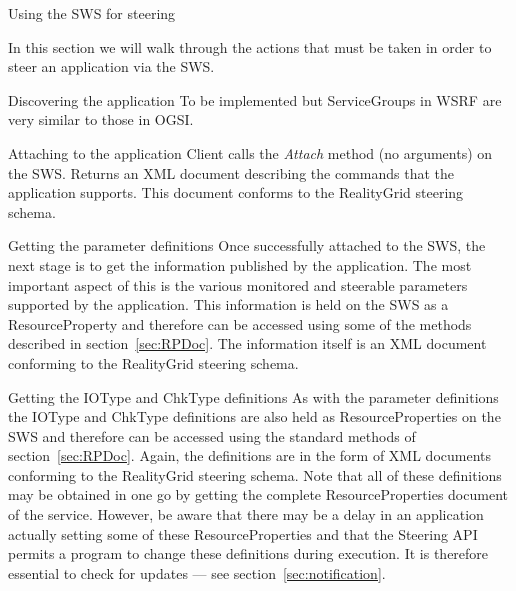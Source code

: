 \documentclass[a4paper]{article}
\begin{document}

\begin{section}{Using the SWS for steering}
\label{sec:sws_steering}

In this section we will walk through the actions that must be taken in
order to steer an application via the SWS.

\begin{subsection}{Discovering the application}
To be implemented but ServiceGroups in WSRF are very similar to those
in OGSI.
\end{subsection}

\begin{subsection}{Attaching to the application}
Client calls the {\em Attach} method (no arguments) on the SWS.
Returns an XML document describing the commands that the application
supports.  This document conforms to the RealityGrid steering schema.
\end{subsection}

\begin{subsection}{Getting the parameter definitions}
Once successfully attached to the SWS, the next stage is to get the
information published by the application.  The most important aspect
of this is the various monitored and steerable parameters supported by
the application.  This information is held on the SWS as a
ResourceProperty and therefore can be accessed using some of the
methods described in section~\ref{sec:RPDoc}.  The information itself
is an XML document conforming to the RealityGrid steering schema.
\end{subsection}

\begin{subsection}{Getting the IOType and ChkType definitions}
As with the parameter definitions the IOType and ChkType definitions
are also held as ResourceProperties on the SWS and therefore can be
accessed using the standard methods of section~\ref{sec:RPDoc}.
Again, the definitions are in the form of XML documents conforming to
the RealityGrid steering schema.  Note that all of these definitions
may be obtained in one go by getting the complete ResourceProperties
document of the service.  However, be aware that there may be a delay
in an application actually setting some of these ResourceProperties
and that the Steering API permits a program to change these
definitions during execution.  It is therefore essential to check for
updates --- see section~\ref{sec:notification}.
\end{subsection}


\end{section}
\end{document}
